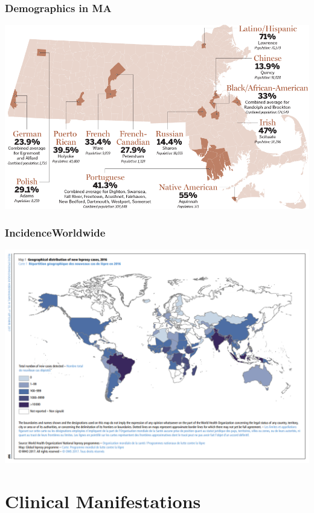 \documentclass{beamer}
\begin{document}
	\begin{frame}
		\frametitle{Demographics in MA}
		\centering
		\includegraphics[width=1.0\textheight]{ma-immigration.png}
		
	\end{frame}

	\begin{frame}
		\frametitle{Incidence\textemdash Worldwide}
		\includegraphics[width=1.0\textwidth,keepaspectratio]{hansen-incidence-world.png}
	\end{frame}
\section{Clinical Manifestations}
\end{document}

